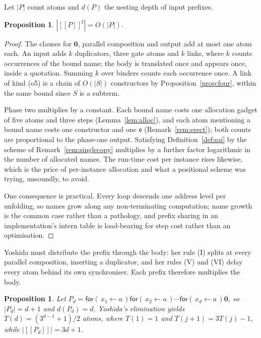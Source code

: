 \documentclass[11pt]{article}
\theoremstyle{plain}
\newtheorem{proposition}[theorem]{Proposition}
\theoremstyle{definition}
\theoremstyle{remark}
\newcommand{\inp}[3]{\mathsf{for}(\,#1 \leftarrow #2\,)#3}
\newcommand{\nil}{\mathbf{0}}
\newcommand{\enc}[1]{[\![#1]\!]}
\newcommand{\ev}{\mathsf{e}}
\begin{document}
Let $|P|$ count atoms and $d(P)$ the nesting depth of input prefixes.

\begin{proposition}
\label{prop:linear}
$|\enc{P}^{\sharp}| = O(|P|)$.
\end{proposition}

\begin{proof}
The clauses for $\nil$, parallel composition and output add at most one atom
each. An input adds $k$ duplicators, three gate atoms and $k$ links, where
$k$ counts occurrences of the bound name; the body is translated once and
appears once, inside a quotation. Summing $k$ over binders counts each
occurrence once. A link of kind (o5) is a chain of $O(|S|)$ constructors by
Proposition~\ref{prop:four}, within the same bound since $S$ is a subterm.

Phase two multiplies by a constant. Each bound name costs one allocation
gadget of five atoms and three steps (Lemma~\ref{lem:alloc}), and each atom
mentioning a bound name costs one constructor and one $\ev$
(Remark~\ref{rem:erect}); both counts are proportional to the phase-one
output. Satisfying Definition~\ref{def:sai} by the scheme of
Remark~\ref{rem:singlecopy} multiplies by a further factor logarithmic in the
number of allocated names. The run-time cost per instance rises likewise,
which is the price of per-instance allocation and what a positional scheme
was trying, unsoundly, to avoid.

One consequence is practical. Every loop descends one address level per
unfolding, so names grow along any non-terminating computation; name growth
is the common case rather than a pathology, and prefix sharing in an
implementation's intern table is load-bearing for step cost rather than an
optimisation.
\end{proof}

Yoshida must distribute the prefix through the body: her rule (I) splits at
every parallel composition, inserting a duplicator, and her rules (V) and
(VI) delay every atom behind its own synchroniser. Each prefix therefore
multiplies the body.

\begin{proposition}
\label{prop:blowup}
Let $P_{d} = \inp{x_{1}}{a}{\inp{x_{2}}{a}{\cdots \inp{x_{d}}{a}{\nil}}}$, so
$|P_{d}| = d+1$ and $d(P_{d}) = d$. Yoshida's elimination yields
$T(d) = (3^{d-1}+1)/2$ atoms, where $T(1) = 1$ and $T(j+1) = 3T(j)-1$, while
$|\enc{P_{d}}| = 3d+1$.
\end{proposition}
\end{document}
